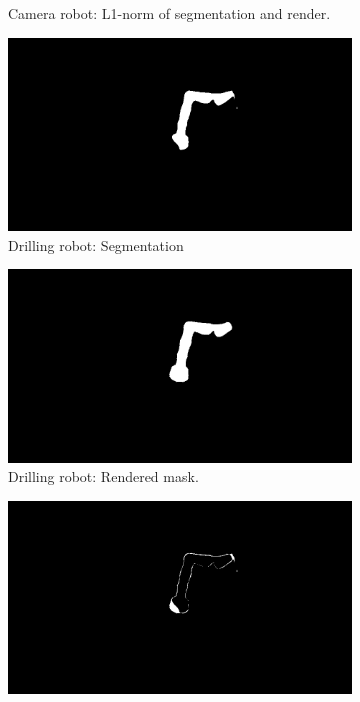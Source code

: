 \begin{figure}
\begin{subfigure}[b]{0.32\textwidth}
        \caption{Camera robot: L1-norm of segmentation and render.}
    \end{subfigure}
    \begin{subfigure}[b]{0.32\textwidth}
        \includegraphics[width=\textwidth]{chapter_1/img/drill_left_mask_1.png}
        \caption{Drilling robot: Segmentation}
    \end{subfigure}
    \begin{subfigure}[b]{0.32\textwidth}
        \includegraphics[width=\textwidth]{chapter_1/img/drill_left_render_mask_1.png}
        \caption{Drilling robot: Rendered mask.}
    \end{subfigure}
    \begin{subfigure}[b]{0.32\textwidth}
        \includegraphics[width=\textwidth]{chapter_1/img/drill_left_difference_1.png}

\end{subfigure}
\end{figure}
